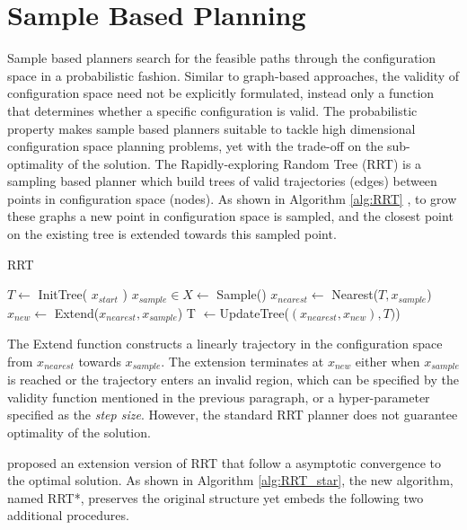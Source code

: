 \documentclass[../thesis.tex]{subfiles}
\begin{document}
 
 
\section{Sample Based Planning}
\label{sec:sample_based_planning}
 
Sample based planners search for the feasible paths through the configuration space in a probabilistic fashion.
Similar to graph-based approaches, the validity of configuration space need not be explicitly formulated, instead only a function that determines whether a specific configuration is valid.
The probabilistic property makes sample based planners suitable to tackle high dimensional configuration space planning problems, yet with the trade-off on the sub-optimality of the solution.
The Rapidly-exploring Random Tree (RRT) is a sampling based planner which build trees of valid trajectories (edges) between points in configuration space (nodes).
As shown in Algorithm \ref{alg:RRT} \cite{lavalle1998rapidly}, to grow these graphs a new point in configuration space is sampled, and the closest point on the existing tree is extended towards this sampled point.
 
\begin{algorithm}
  \caption{RRT} \label{alg:RRT}
  \begin{algorithmic}[1]
  \State $T \leftarrow$ InitTree( $x_{start}$ )
        \State $x_{sample} \in X \leftarrow$ Sample()
        \State $x_{nearest} \leftarrow $ Nearest($T, x_{sample}$)
        \State $x_{new} \leftarrow $ Extend($x_{nearest}, x_{sample}$)
        \State T $\leftarrow $UpdateTree($(x_{nearest},x_{new}), T)$)
  \EndWhile
  \end{algorithmic}
\end{algorithm}
 
The Extend function constructs a linearly trajectory in the configuration space from $x_{nearest}$ towards $x_{sample}$.
The extension terminates at $x_{new}$ either when $x_{sample}$ is reached or the trajectory enters an invalid region, which can be specified by the validity function mentioned in the previous paragraph, or a hyper-parameter specified as the \textit{step size}.
However, the standard RRT planner does not guarantee optimality of the solution.
 
\citet{karaman2011sampling} proposed an extension version of RRT that follow a asymptotic convergence to the optimal solution.
As shown in Algorithm \ref{alg:RRT_star}, the new algorithm, named RRT*, preserves the original structure yet embeds the following two additional procedures.
 
\end{document}
